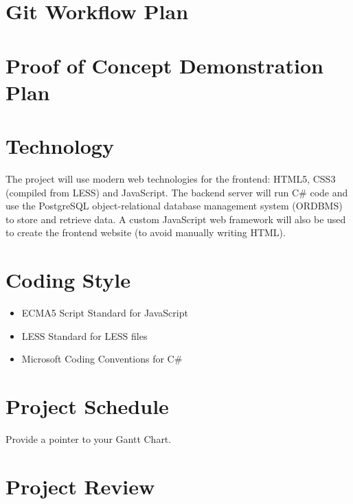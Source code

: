 \documentclass{article}
\begin{document}
\section{Git Workflow Plan}

\section{Proof of Concept Demonstration Plan}

\section{Technology}
The project will use modern web technologies for the frontend: HTML5, CSS3
(compiled from LESS) and JavaScript. The backend server will run C\# code and
use the PostgreSQL object-relational database management system (ORDBMS) to
store and retrieve data. A custom JavaScript web framework will also be used to
create the frontend website (to avoid manually writing HTML).

\section{Coding Style}
\begin{itemize}
  \item ECMA5 Script Standard for JavaScript
  \item LESS Standard for LESS files
  \item Microsoft Coding Conventions for C\#
\end{itemize}

\section{Project Schedule}

Provide a pointer to your Gantt Chart.

\section{Project Review}
\end{document}
